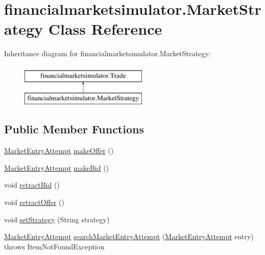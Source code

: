 \hypertarget{classfinancialmarketsimulator_1_1_market_strategy}{\section{financialmarketsimulator.\+Market\+Strategy Class Reference}
\label{classfinancialmarketsimulator_1_1_market_strategy}
}
Inheritance diagram for financialmarketsimulator.\+Market\+Strategy\+:\begin{figure}[H]
\begin{center}
\leavevmode
\includegraphics[height=2.000000cm]{classfinancialmarketsimulator_1_1_market_strategy}
\end{center}
\end{figure}
\subsection*{Public Member Functions}
\begin{DoxyCompactItemize}
\item 
\hyperlink{classfinancialmarketsimulator_1_1_market_entry_attempt}{Market\+Entry\+Attempt} \hyperlink{classfinancialmarketsimulator_1_1_market_strategy_a82e5b65bef66ffadea8085e3ca107130}{make\+Offer} ()
\item 
\hyperlink{classfinancialmarketsimulator_1_1_market_entry_attempt}{Market\+Entry\+Attempt} \hyperlink{classfinancialmarketsimulator_1_1_market_strategy_a2a518f43a8460feab62ef5c31d0e02c9}{make\+Bid} ()
\item 
void \hyperlink{classfinancialmarketsimulator_1_1_market_strategy_ab7bbd10cab2e86f3c48c81bbb4c058e2}{retract\+Bid} ()
\item 
void \hyperlink{classfinancialmarketsimulator_1_1_market_strategy_aa3e0b344b5025ab9aa4a36df70b48ec3}{retract\+Offer} ()
\item 
void \hyperlink{classfinancialmarketsimulator_1_1_market_strategy_ae65923e56266106ecb5b4b7f89a4e70b}{set\+Strategy} (String strategy)
\item 
\hyperlink{classfinancialmarketsimulator_1_1_market_entry_attempt}{Market\+Entry\+Attempt} \hyperlink{classfinancialmarketsimulator_1_1_market_strategy_ac773269f4e29a7b1099b3495d1781823}{search\+Market\+Entry\+Attempt} (\hyperlink{classfinancialmarketsimulator_1_1_market_entry_attempt}{Market\+Entry\+Attempt} entry)  throws Item\+Not\+Found\+Exception 
\end{DoxyCompactItemize}



